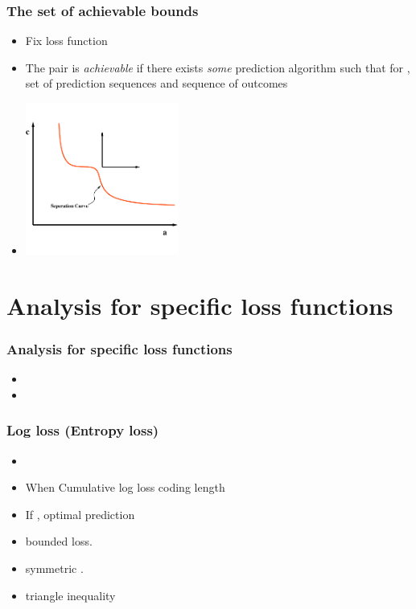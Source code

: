 \documentclass{beamer}
\begin{document}
\begin{frame}
\frametitle{The set of achievable bounds}
\begin{itemize}
\item 
Fix loss function \R{$\lambda: \Omega \times \Gamma \to [0,\infty)$}
\item
The pair  is {\em achievable} if there exists 
{\em some} prediction algorithm
such that for  ,  set of  prediction
sequences and  sequence of outcomes
\item
\begin{center}
\includegraphics[height=5cm]{figures/achievable1.pdf}
\end{center}
\end{itemize}
\end{frame}

\section{Analysis for specific loss functions}

\begin{frame}
\frametitle{Analysis for specific loss functions}
\begin{itemize}
\item
{}   
\item
{} 
\end{itemize}
\end{frame}

\begin{frame}
\frametitle{Log loss (Entropy loss)} 
\begin{itemize}
\item
\R{\[ \lambda_{\text{ent}}(\omega,\gamma) = \omega \ln \frac{\omega}{\gamma} 
                              +(1-\omega) \ln \frac{1-\omega}{1-\gamma} \]}
\item
When  Cumulative log loss \R{$=$} coding length 
\item
If , optimal prediction 
\item
{}bounded loss.
\item
{} symmetric .
\item
{} triangle inequality
\end{itemize}
\end{frame}
\end{document}
